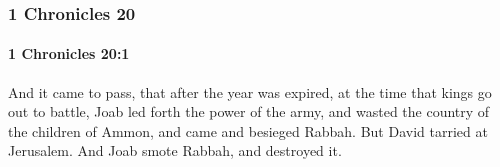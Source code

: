 	\subsubsection{1 Chronicles 20} %
		\label{1CHRONICLES-20}

		\paragraph{1 Chronicles 20:1} %
			\label{1CHRONICLES-20-1}

			And it came to pass, that after the year was expired, at the time that kings go out to battle, Joab led forth the power of the army, and wasted the country of the children of Ammon, and came and besieged Rabbah. But David tarried at Jerusalem. And Joab smote Rabbah, and destroyed it.


